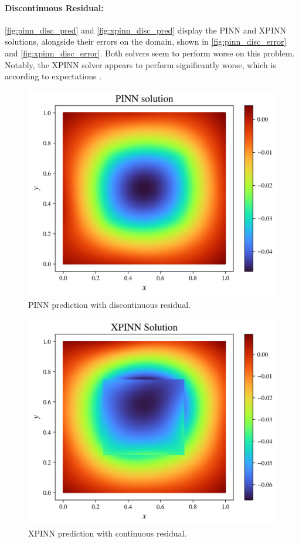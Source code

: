 
\paragraph{Discontinuous Residual:}
\autoref{fig:pinn_disc_pred} and \autoref{fig:xpinn_disc_pred} display the PINN and XPINN solutions, alongside their errors on the domain, shown in \autoref{fig:pinn_disc_error} and \autoref{fig:xpinn_disc_error}.
Both solvers seem to perform worse on this problem. Notably, the XPINN solver appears to perform significantly worse, which is according to expectations \cite{XPINN_generalize}.

\begin{figure}[h]
    \centering
    \includegraphics[width=0.7\linewidth]{Project1XPINNs/figures/Poisson/discrete_single_Poisson_solution.pdf.png}
    \caption{PINN prediction with discontinuous residual.}
    \label{fig:pinn_disc_pred}
\end{figure}

\begin{figure}[h]
    \centering
    \includegraphics[width=0.7\linewidth]{Project1XPINNs/figures/Poisson/discrete_xpinn_Poisson_solution.png}
    \caption{XPINN prediction with continuous residual.}
    \label{fig:xpinn_disc_pred}
\end{figure}

